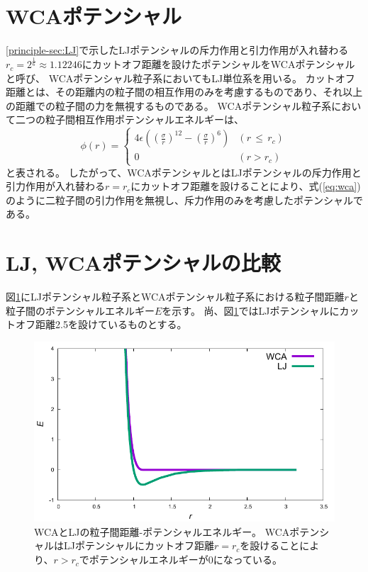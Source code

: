 \documentclass[titlepage]{jsreport}
\begin{document}
\section{WCAポテンシャル}\label{principle-sec:WCA}
\ref{principle-sec:LJ}で示したLJポテンシャルの斥力作用と引力作用が入れ替わる$r_c=2^{\frac{1}{6}}{\approx}1.12246$にカットオフ距離を設けたポテンシャルをWCAポテンシャルと呼び、
WCAポテンシャル粒子系においてもLJ単位系を用いる。
カットオフ距離とは、その距離内の粒子間の相互作用のみを考慮するものであり、それ以上の距離での粒子間の力を無視するものである\cite{cutoff}。
WCAポテンシャル粒子系において二つの粒子間相互作用ポテンシャルエネルギーは、
\large
\begin{equation}
\phi(r) = \left\{ \begin{array}{ll}
    4{\epsilon}\left(\left(\frac{\sigma}{r}\right)^{12}-\left(\frac{\sigma}{r}\right)^6\right) & (r\,{\leq}\,{r_c}) \\
    0 & (r>r_c)\label{eq:wca}
\end{array} \right.
\end{equation}
\normalsize
と表される\cite{wca}。
したがって、WCAポテンシャルとはLJポテンシャルの斥力作用と引力作用が入れ替わる$r=r_c$にカットオフ距離を設けることにより、式(\ref{eq:wca})のように二粒子間の引力作用を無視し、斥力作用のみを考慮したポテンシャルである。


\section{LJ, WCAポテンシャルの比較}\label{principle-sec:LJ-WCA}
図\ref{fig:dis-poen}にLJポテンシャル粒子系とWCAポテンシャル粒子系における粒子間距離$r$と粒子間のポテンシャルエネルギー$E$を示す。
尚、図\ref{fig:dis-poen}ではLJポテンシャルにカットオフ距離2.5を設けているものとする。

\newpage
\begin{figure}[htbp]
    \begin{center}
        \includegraphics[width=14cm]{fig/dis-poen/dis-poen.pdf}
    \end{center}
    \caption{WCAとLJの粒子間距離-ポテンシャルエネルギー。
    WCAポテンシャルはLJポテンシャルにカットオフ距離$r=r_c$を設けることにより、$r>r_c$でポテンシャルエネルギーが0になっている。}
    \label{fig:dis-poen}
\end{figure}
\end{document}
